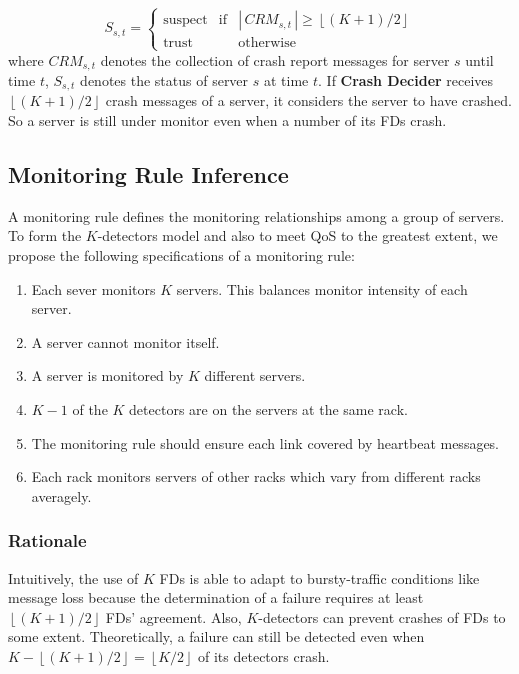 \documentclass{sig-alternate-05-2015}
\begin{document}
\begin{equation}
S_{s,t}=\left\{
    \begin{array}{lcl}
    \text{suspect} & \text{if} & |\,CRM_{s,t}\,|\geq\left\lfloor(K+1)/2\right\rfloor \\

    \text{trust} && \text{otherwise}
    \end{array}
\right.
\end{equation}
where $CRM_{s,t}$ denotes the collection of crash report messages for server $s$ until time $t$, $S_{s,t}$ denotes the status of server $s$ at time $t$. If \textbf{Crash Decider} receives $\left\lfloor(K+1)/2\right\rfloor$ crash messages of a server, it considers the server to have crashed. So a server is still under monitor even when a number of its FDs crash.

\subsection{Monitoring Rule Inference}
A monitoring rule defines the monitoring relationships among a group of servers. To form the $K$-detectors model and also to meet QoS to the greatest extent, we propose the following specifications of a monitoring rule:
\begin{enumerate}
    \item Each sever monitors $K$ servers. This balances monitor intensity of each server.
    \item A server cannot monitor itself.
    \item A server is monitored by $K$ different servers.
    \item $K-1$ of the $K$ detectors are on the servers at the same rack.
    \item The monitoring rule should ensure each link covered by heartbeat messages.
    \item Each rack monitors servers of other racks which vary from different racks averagely.
\end{enumerate}

\subsubsection*{Rationale}
\quad Intuitively, the use of $K$ FDs is able to adapt to bursty-traffic conditions like message loss because the determination of a failure requires at least $\left\lfloor(K+1)/2\right\rfloor$ FDs' agreement. Also, $K$-detectors can prevent crashes of FDs to some extent. Theoretically, a failure can still be detected even when $K-\left\lfloor(K+1)/2\right\rfloor=\left\lfloor K/2\right\rfloor$ of its detectors crash.
\end{document}

